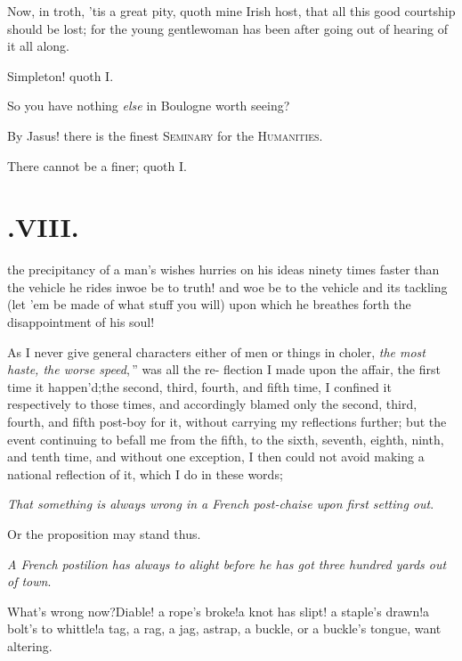 \documentclass{article}
\begin{document}
\tsh Now, in troth, ’tis a great pity, quoth mine
Irish host, that all this good courtship should be lost; for
the young gentlewoman has been after going out of hearing of it all
along\tsh.

\tsh Simpleton! quoth I.

\tsh So you have nothing \textit{else} in Bou\-logne
worth seeing?

\tsk By Jasus! there is the finest\break
\textsc{Seminary} for the \textsc{Humanities}\tsh.

\tsk There cannot be a finer; quoth I.

\section{.\enspace VIII.}

 the precipitancy of a
man’s wishes hurries on his ideas ninety times faster than
the vehicle he rides in\tsk woe be to truth! and woe be to the
vehicle and its tackling (let ’em be made of what stuff you
will) upon which he breathes forth the disappointment of his
soul!

As I never give general characters either of men or things in
choler, \lqq\textit{the most haste, the worse speed},\,” was
all the re- flection I made upon the affair, the first time it
happen’d;\tsk the second, third, fourth, and fifth time, I
confined it respectively to those times, and accordingly blamed
only the second, third, fourth, and fifth post-boy for it, without
carrying my reflections further; but the event
continuing to befall me from the fifth, to the sixth, seventh,
eighth, ninth, and tenth time, and without one exception, I then
could not avoid making a national reflection of it, which I do in
these words;

\textit{That something is always wrong in a French post-chaise upon
first setting out}.

Or the proposition may stand thus.

\textit{A French postilion has always to alight before he has got
three hundred yards out of town}.

What’s wrong now?\tsh Diable!\tsh\break
a rope’s broke!\tsh a knot has slipt!\break
\tsh a staple’s drawn!\tsh a bolt’s to whittle!\tsh a tag, a
rag, a jag, a\break strap, a buckle, or a
buckle’s tongue, want altering.\tsh
\end{document}
